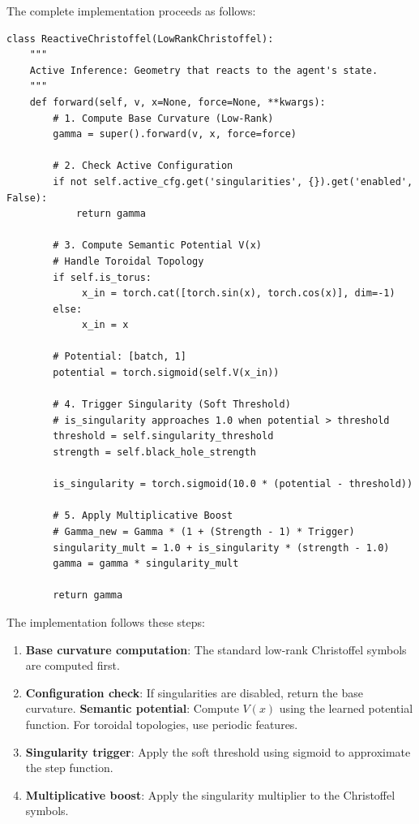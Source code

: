 \documentclass[12pt,letterpaper,twoside]{article}
\begin{document}
The complete implementation proceeds as follows:

\begin{verbatim}
class ReactiveChristoffel(LowRankChristoffel):
    """
    Active Inference: Geometry that reacts to the agent's state.
    """
    def forward(self, v, x=None, force=None, **kwargs):
        # 1. Compute Base Curvature (Low-Rank)
        gamma = super().forward(v, x, force=force)
        
        # 2. Check Active Configuration
        if not self.active_cfg.get('singularities', {}).get('enabled', False):
            return gamma

        # 3. Compute Semantic Potential V(x)
        # Handle Toroidal Topology
        if self.is_torus:
             x_in = torch.cat([torch.sin(x), torch.cos(x)], dim=-1)
        else:
             x_in = x
             
        # Potential: [batch, 1]
        potential = torch.sigmoid(self.V(x_in)) 
        
        # 4. Trigger Singularity (Soft Threshold)
        # is_singularity approaches 1.0 when potential > threshold
        threshold = self.singularity_threshold
        strength = self.black_hole_strength
        
        is_singularity = torch.sigmoid(10.0 * (potential - threshold))
        
        # 5. Apply Multiplicative Boost
        # Gamma_new = Gamma * (1 + (Strength - 1) * Trigger)
        singularity_mult = 1.0 + is_singularity * (strength - 1.0)
        gamma = gamma * singularity_mult
            
        return gamma
\end{verbatim}

The implementation follows these steps:
\begin{enumerate}
    \item \textbf{Base curvature computation}: The standard low-rank Christoffel symbols are computed first.
    \item \textbf{Configuration check}: If singularities are disabled, return the base curvature.
    \textbf{Semantic potential}: Compute $V(x)$ using the learned potential function. For toroidal topologies, use periodic features.
    \item \textbf{Singularity trigger}: Apply the soft threshold using sigmoid to approximate the step function.
    \item \textbf{Multiplicative boost}: Apply the singularity multiplier to the Christoffel symbols.
\end{enumerate}
\end{document}
